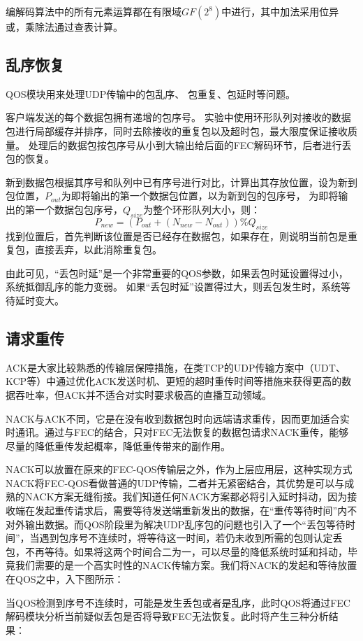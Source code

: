 \documentclass[onecolumn]{article}
\begin{document}
\begin{CJK*}{UTF8}{gbsn}
		编解码算法中的所有元素运算都在有限域$GF(2^8)$中进行，其中加法采用位异或，乘除法通过查表计算。
		
		\subsection{乱序恢复}
		QOS模块用来处理UDP传输中的包乱序、 包重复、包延时等问题。
		
		客户端发送的每个数据包拥有递增的包序号。
		实验中使用环形队列对接收的数据包进行局部缓存并排序，同时去除接收的重复包以及超时包，最大限度保证接收质量。
		处理后的数据包按包序号从小到大输出给后面的FEC解码环节，后者进行丢包的恢复。
		
		新到数据包根据其序号和队列中已有序号进行对比，计算出其存放位置，设为新到包位置，$P_{out}$为即将输出的第一个数据包位置，以为新到包的包序号， 为即将输出的第一个数据包包序号，$Q_{size}$为整个环形队列大小，则：
		$$P_{new} = (P_{out} + (N_{new} - N_{out}))\%Q_{size}$$
		找到位置后，首先判断该位置是否已经存在数据包，如果存在，则说明当前包是重复包，直接丢弃，以此消除重复包。
		
		由此可见，“丢包时延”是一个非常重要的QOS参数，如果丢包时延设置得过小， 系统抵御乱序的能力变弱。
		如果“丢包时延”设置得过大，则丢包发生时，系统等待延时变大。
		
		\subsection{请求重传}
		ACK是大家比较熟悉的传输层保障措施，在类TCP的UDP传输方案中（UDT、KCP等）中通过优化ACK发送时机、更短的超时重传时间等措施来获得更高的数据吞吐率，但ACK并不适合对实时要求极高的直播互动领域。
		
		NACK与ACK不同，它是在没有收到数据包时向远端请求重传，因而更加适合实时通讯。通过与FEC的结合，只对FEC无法恢复的数据包请求NACK重传，能够尽量的降低重传发起概率，降低重传带来的副作用。
		
		NACK可以放置在原来的FEC-QOS传输层之外，作为上层应用层，这种实现方式NACK将FEC-QOS看做普通的UDP传输，二者并无紧密结合，其优势是可以与成熟的NACK方案无缝衔接。我们知道任何NACK方案都必将引入延时抖动，因为接收端在发起重传请求后，需要等待发送端重新发出的数据，在“重传等待时间”内不对外输出数据。而QOS阶段里为解决UDP乱序包的问题也引入了一个“丢包等待时间”，当遇到包序号不连续时，将等待这一时间，若仍未收到所需的包则认定丢包，不再等待。如果将这两个时间合二为一，可以尽量的降低系统时延和抖动，毕竟我们需要的是一个高实时性的NACK传输方案。我们将NACK的发起和等待放置在QOS之中，入下图所示：
		
		当QOS检测到序号不连续时，可能是发生丢包或者是乱序，此时QOS将通过FEC解码模块分析当前疑似丢包是否将导致FEC无法恢复。此时将产生三种分析结果：
		

\end{CJK*}
\end{document}
